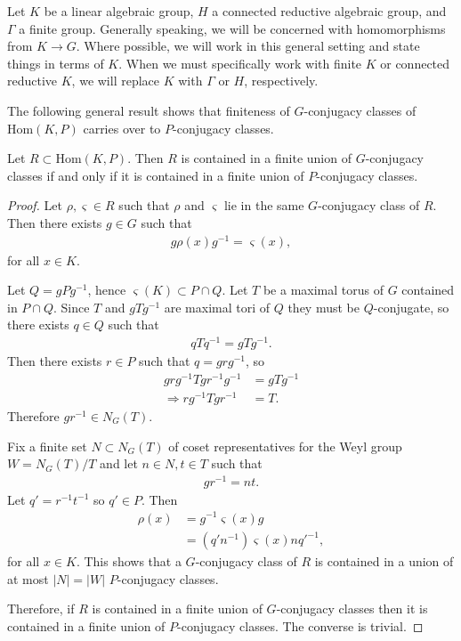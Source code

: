Let $K$ be a linear algebraic group, $H$ a connected reductive algebraic group, and $\Gamma$ a finite group.
Generally speaking, we will be concerned with homomorphisms from $K \rightarrow G$. Where possible, we will work in this general setting and state things in terms of $K$. When we must specifically work with finite $K$ or connected reductive $K$, we will replace $K$ with $\Gamma$ or $H$, respectively.

The following general result shows that finiteness of $G$-conjugacy classes of $\mathrm{Hom}(K, P)$ carries over to $P$-conjugacy classes. 
\begin{lemma} Let $R \subset \mathrm{Hom}(K, P)$. Then $R$ is contained in a finite union of $G$-conjugacy classes if and only if it is contained in a finite union of $P$-conjugacy classes.
  \label{lem:GPconj}
\end{lemma}
\begin{proof}
	Let $\rho, \varsigma \in R$ such that $\rho$ and $\varsigma$ lie in the same $G$-conjugacy class of $R$. Then there exists $g\in G$ such that
	\begin{align*}
		g \rho(x) g^{-1} = \varsigma(x),
	\end{align*}
for all $x \in K$.
	
	Let $Q = gPg^{-1}$, hence $\varsigma(K) \subset P \cap Q$.
	Let $T$ be a maximal torus of $G$ contained in $P\cap Q$. Since $T$ and $gTg^{-1}$ are maximal tori of $Q$ they must be $Q$-conjugate, so there exists $q\in Q$ such that
	\begin{align*}
		qTq^{-1} = gTg^{-1}.
	\end{align*}
	Then there exists $r\in P$ such that $q = grg^{-1}$, so
	\begin{align*}
		grg^{-1}Tgr^{-1}g^{-1} &= gTg^{-1} \\
		\Rightarrow rg^{-1}Tgr^{-1} &= T.
	\end{align*}
	Therefore $gr^{-1} \in N_G(T)$. 

	Fix a finite set $N \subset N_G(T)$ of coset representatives for the Weyl group $W = N_G(T)/T$ and let $n \in N, t \in T$ such that
	\begin{align*}
		gr^{-1} = nt.
	\end{align*}
	Let $q' = r^{-1}t^{-1}$ so $q' \in P$. Then
	\begin{align*}
		\rho(x) &= g^{-1} \varsigma(x) g\\
		&= (q'n^{-1}) \varsigma(x) nq'^{-1},
	\end{align*}
	for all $x \in K$.
	This shows 
	that a $G$-conjugacy class of $R$ is contained in a union of at most $|N| = |W|$ $P$-conjugacy classes.

	Therefore, if $R$ is contained in a finite union of $G$-conjugacy classes then it is contained in a finite union of $P$-conjugacy classes. The converse is trivial.
\end{proof}


